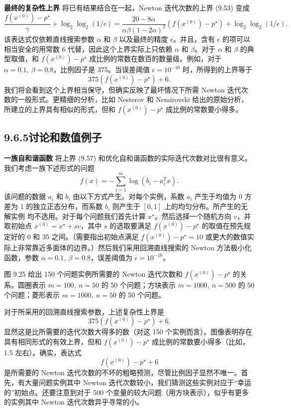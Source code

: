 \documentclass[UTF8, 12pt, fontset=fandol, oneside]{ctexart}
\begin{document}
\noindent\textbf{最终的复杂性上界}\quad
将已有结果结合在一起，Newton 迭代次数的上界 (9.53) 变成
\begin{equation}
\frac{f(x^{(0)})-p^\star}{\gamma}+\log_2\log_2(1/\epsilon)
=\frac{20-8\alpha}{\alpha\beta(1-2\alpha)^2}(f(x^{(0)})-p^\star)
+\log_2\log_2(1/\epsilon).
\tag{9.56}
\end{equation}
该表达式仅依赖直线搜索参数 $\alpha$ 和 $\beta$ 以及最终的精度 $\epsilon$。并且，含有 $\epsilon$ 的项可以相当安全的用常数 6 代替，因此这个上界实际上只依赖 $\alpha$ 和 $\beta$。对于 $\alpha$ 和 $\beta$ 的典型取值，和 $f(x^{(0)})-p^\star$ 成比例的常数在数百的数量级。例如，对于 $\alpha=0.1,\ \beta=0.8$，比例因子是 375。当误差阈值 $\epsilon=10^{-10}$ 时，所得到的上界等于
\begin{equation}
375(f(x^{(0)})-p^\star)+6.
\tag{9.57}
\end{equation}
我们将会看到这个上界相当保守，但确实反映了最坏情况下所需 Newton 迭代次数的一般形式。更精细的分析，比如 Nesterov 和 Nemirovski 给出的原始分析，所建立的上界具有相似的形式，但和 $f(x^{(0)})-p^\star$ 成比例的常数要小得多。

\subsection*{9.6.5\quad 讨论和数值例子}

\noindent\textbf{一族自和谐函数}\quad
将上界 (9.57) 和优化自和谐函数的实际迭代次数对比很有意义。我们考虑一族下述形式的问题
\[
f(x)=-\sum_{i=1}^m\log(b_i-a_i^Tx).
\]
该问题的数据 $a_i$ 和 $b_i$ 由以下方式产生。对每个实例，系数 $a_i$ 产生于均值为 0 方差为 1 的独立正态分布，而系数 $b_i$ 则产生于 $[0,1]$ 上的均匀分布。所产生的无解实例
均不选用。对于每个问题我们首先计算 $x^\star$。然后选择一个随机方向 $v$，并取初始点 $x^{(0)}=x^\star+sv$，其中 $s$ 的选取要满足 $f(x^{(0)})-p^\star$ 的取值在预先规定好的 0 和 35 之间。（需要指出初始点满足 $f(x^{(0)})-p^\star=10$ 或更大的数值实际上非常靠近多面体的边界。）然后我们采用回溯直线搜索的 Newton 方法极小化函数，参数 $\alpha=0.1,\ \beta=0.8$，误差阈值为 $\epsilon=10^{-10}$。

图 9.25 给出 150 个问题实例所需要的 Newton 迭代次数和 $f(x^{(0)})-p^\star$ 的关系。圆圈表示 $m=100,\ n=50$ 的 50 个问题；方块表示 $m=1000,\ n=500$ 的 50 个问题；菱形表示 $m=1000,\ n=50$ 的 50 个问题。

对于所采用的回溯直线搜索参数，上述复杂性上界是
\begin{equation}
375(f(x^{(0)})-p^\star)+6.
\tag{9.58}
\end{equation}
显然这是比所需要的迭代次数大得多的数（对这 150 个实例而言）。图像表明存在具有相同形式的有效上界，但和 $f(x^{(0)})-p^\star$ 成比例的常数要小得多（比如，1.5 左右）。确实，表达式
\[
f(x^{(0)})-p^\star+6
\]
是所需要的 Newton 迭代次数的不坏的粗略预测，尽管比例因子显然不唯一。首先，有大量问题实例其中 Newton 迭代次数较小，我们猜测这些实例对应于“幸运的”初始点。还要注意到对于 500 个变量的较大问题（用方块表示），似乎有更多的实例其中 Newton 迭代次数异乎寻常的小。
\end{document}
